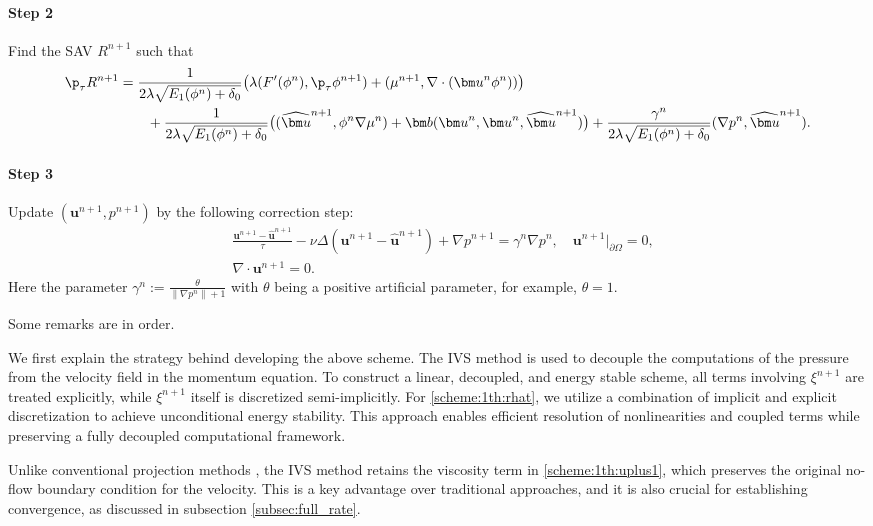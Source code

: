 \paragraph{\bf Step 2}  Find the SAV $R^{n+1}$ such that 
\begin{equation}\label{scheme:1th:rhat}
	\begin{aligned}
		\p_{\tau}  R^{n+1} 
		&=\frac{1}{2\lambda \sqrt{E_1(\phi^n)+\delta_0}} \big( \lambda (F^{\prime}(\phi^n), \p_\tau  \phi^{n+1} ) + (\mu^{n+1},  \nabla \cdot({\bm u}^n \phi^n)) \big) \\
		&\qquad +\frac{1}{2\lambda \sqrt{E_1(\phi^n)+\delta_0}} \big( (\widehat{\bm u}^{n+1}, \phi^n \nabla \mu^n)
		+ \bm b({\bm u}^n, {\bm u}^n,  \widehat {\bm u}^{n+1}) \big)
		+\frac{\gamma^n}{2\lambda \sqrt{E_1(\phi^n)+\delta_0}}   (\nabla p^n,  \widehat {\bm u}^{n+1}).
	\end{aligned}
\end{equation}

\paragraph{\bf Step 3}  Update $ (\bm u^{n+1}, p^{n+1})$ by the following correction step:
\begin{align}
	& \frac{\bm u^{n+1}- \widehat {\bm u}^{n+1} }{\tau}-\nu \Delta ( \bm u^{n+1}- \widehat {\bm u}^{n+1})+\nabla p^{n+1} = \gamma^n  \nabla p^{n}, \quad  {\bm u}^{n+1}|_{\partial \Omega}=0, \label{scheme:1th:uplus1}   \\
	& \nabla \cdot  \bm u^{n+1} = 0. \label{scheme:1th:div}
\end{align}
Here the parameter $\gamma^n:=\frac{\theta}{\|\nabla p^n \|+1}$
with $\theta$ being a positive artificial parameter, for example, $\theta=1$.


Some remarks are in order.
\begin{remark}\label{rem:e1}   We first explain the strategy behind developing the above scheme.  The  IVS method is used to  decouple the computations of the pressure from the velocity field in the momentum equation. To construct a linear, decoupled, and energy stable scheme, all terms involving $\xi^{n+1}$ are treated  explicitly,  while $\xi^{n+1}$  itself is discretized semi-implicitly. For \eqref{scheme:1th:rhat}, we utilize a combination of implicit and explicit discretization to achieve unconditional energy stability. This approach enables efficient resolution of nonlinearities and coupled terms while preserving a fully decoupled computational framework.
\end{remark}
\begin{remark}  
	Unlike conventional projection methods \cite{chorin1968numerical, temam1969approximation, guermond2006overview}, the IVS method \cite{yakoubi2023enhancing} retains the viscosity term in \eqref{scheme:1th:uplus1}, which preserves the original no-flow boundary condition for the velocity. This is a key advantage over traditional approaches, and it is also crucial for establishing convergence, as discussed in subsection \ref{subsec:full_rate}.
\end{remark}

